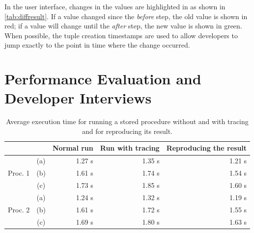 In the user interface, changes in the values are highlighted in as shown in \cref{tab:diffresult}.
If a value changed since the \emph{before} step, the old value is shown in red; if a value will change until the \emph{after} step, the new value is shown in green.
When possible, the tuple creation timestamps are used to allow developers to jump exactly to the point in time where the change occurred.


%


\section{Performance Evaluation and Developer Interviews}

\tmpStart

%

\begin{table}
	\centering
	\begin{tabulary}{\textwidth}{lcRRR}
	\toprule
				&		& Normal run& Run with tracing  & Reproducing the result \\ \midrule
	
			 &	(a) &	1.27 s		& 1.35 s		& 1.21 s		\\
Proc. 1& (b)	&	1.61 s		& 1.74 s		& 1.54 s		\\
			 &	(c) &	1.73 s		& 1.85 s		& 1.60 s		\\ \midrule

			 &	(a) &	1.24 s		& 1.32 s		& 1.19 s		\\
Proc. 2& (b)	&	1.61 s		& 1.72 s		& 1.55 s		\\
			 &	(c) &	1.69 s		& 1.80 s		& 1.63 s		\\ \bottomrule
	\end{tabulary}
	\caption{Average execution time for running a stored procedure without and with tracing and for reproducing its result.}
	\label{tab:measure1}
\end{table}

